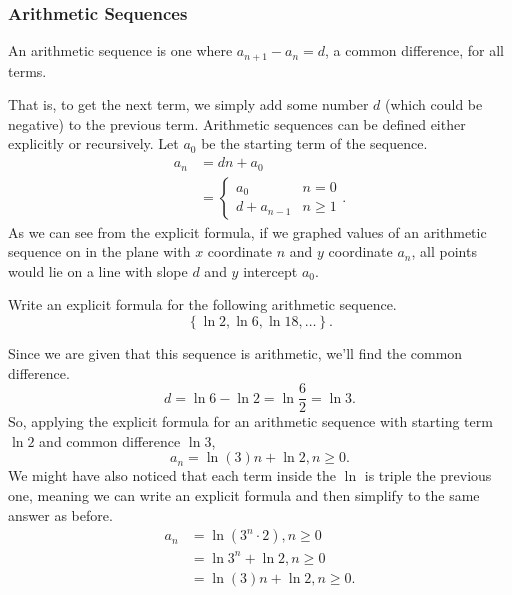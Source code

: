 \subsubsection{Arithmetic Sequences}
\begin{definition}
	An arithmetic sequence is one where $a_{n+1} - a_{n} = d$, a common difference, for all terms.
\end{definition}
\noindent
That is, to get the next term, we simply add some number $d$ (which could be negative) to the previous term.
Arithmetic sequences can be defined either explicitly or recursively.
Let $a_0$ be the starting term of the sequence.
\begin{align*}
	a_n &= dn + a_0 \\
	&= \begin{cases}
		a_0 & n = 0 \\
		d + a_{n-1} & n \geq 1
	\end{cases}.
\end{align*}
As we can see from the explicit formula, if we graphed values of an arithmetic sequence on in the plane with $x$ coordinate $n$ and $y$ coordinate $a_n$, all points would lie on a line with slope $d$ and $y$ intercept $a_0$.

\begin{example}
	Write an explicit formula for the following arithmetic sequence.
	\begin{equation*}
		\left\{\ln{2}, \ln{6}, \ln{18}, \ldots\right\}.
	\end{equation*}
\end{example}
Since we are given that this sequence is arithmetic, we'll find the common difference.
\begin{equation*}
	d = \ln{6} - \ln{2} = \ln{\frac{6}{2}} = \ln{3}.
\end{equation*}
\indent
So, applying the explicit formula for an arithmetic sequence with starting term $\ln{2}$ and common difference $\ln{3}$,
\begin{equation*}
	a_n = \ln{(3)}n + \ln{2}, n\geq 0.
\end{equation*}
\indent
We might have also noticed that each term inside the $\ln$ is triple the previous one, meaning we can write an explicit formula and then simplify to the same answer as before.
\begin{align*}
	a_n &= \ln{(3^{n}\cdot 2)}, n\geq 0 \\
	&= \ln{3^n} + \ln{2}, n \geq 0 \\
	&= \ln{(3)}n + \ln{2}, n \geq 0.
\end{align*}

